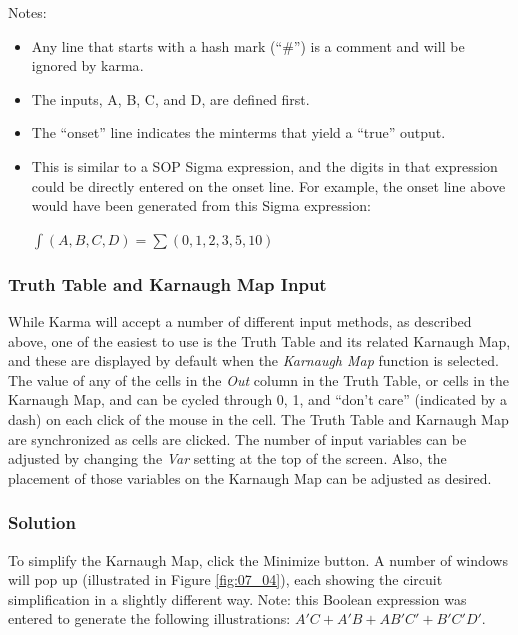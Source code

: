 Notes:

\begin{itemize}
	\item Any line that starts with a hash mark (``\#'') is a comment and will be ignored by \gls{karma}.
	\item The inputs, A, B, C, and D, are defined first.
	\item The ``onset'' line indicates the minterms that yield a ``true'' output.
	\item This is similar to a SOP Sigma expression, and the digits in that expression could be directly entered on the onset line. For example, the onset line above would have been generated from this Sigma expression:

	$ \int(A,B,C,D)=\sum(0,1,2,3,5,10) $
\end{itemize}

\subsubsection{Truth Table and Karnaugh Map Input}

While Karma will accept a number of different input methods, as described above, one of the easiest to use is the Truth Table and its related Karnaugh Map, and these are displayed by default when the \textit{Karnaugh Map} function is selected. The value of any of the cells in the \textit{Out} column in the Truth Table, or cells in the Karnaugh Map, and can be cycled through 0, 1, and ``don’t care'' (indicated by a dash) on each click of the mouse in the cell. The Truth Table and Karnaugh Map are synchronized as cells are clicked. The number of input variables can be adjusted by changing the \textit{Var} setting at the top of the screen. Also, the placement of those variables on the Karnaugh Map can be adjusted as desired.

\subsubsection{Solution}

To simplify the Karnaugh Map, click the Minimize button. A number of windows will pop up (illustrated in Figure \ref{fig:07_04}), each showing the circuit simplification in a slightly different way. Note: this Boolean expression was entered to generate the following illustrations: $ A'C + A'B + AB'C' + B'C'D' $. 

